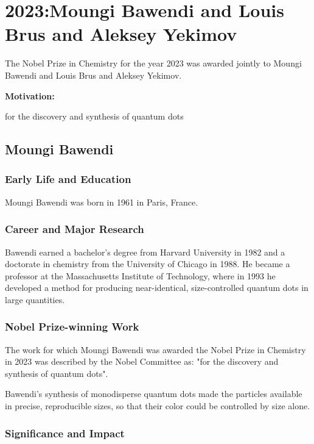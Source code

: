 \chapter{2023:Moungi Bawendi and Louis Brus and Aleksey Yekimov}

\label{chap:chemistry2023}

The Nobel Prize in Chemistry for the year 2023 was awarded jointly to Moungi Bawendi and Louis Brus and Aleksey Yekimov.

\textbf{Motivation:}

for the discovery and synthesis of quantum dots

\section{Moungi Bawendi}

\subsection*{Early Life and Education}

Moungi Bawendi was born in 1961 in Paris, France.

\subsection*{Career and Major Research}

Bawendi earned a bachelor's degree from Harvard University in 1982 and a doctorate in chemistry from the University of Chicago in 1988. He became a professor at the Massachusetts Institute of Technology, where in 1993 he developed a method for producing near-identical, size-controlled quantum dots in large quantities.

\subsection*{Nobel Prize-winning Work}

The work for which Moungi Bawendi was awarded the Nobel Prize in Chemistry in 2023 was described by the Nobel Committee as: "for the discovery and synthesis of quantum dots".

Bawendi's synthesis of monodisperse quantum dots made the particles available in precise, reproducible sizes, so that their color could be controlled by size alone.

\subsection*{Significance and Impact}

